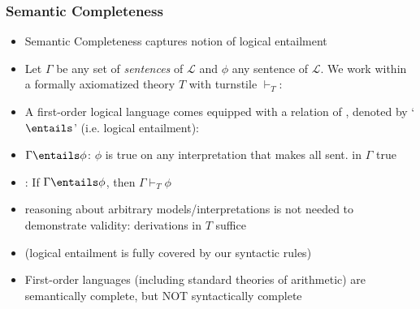 \begin{frame}
\frametitle{Semantic Completeness}

\begin{itemize}[<+->]

\item Semantic Completeness captures notion of logical entailment

\item Let $\Gamma$ be any set of \textit{sentences} of $\mathcal{L}$ and $\phi$ any sentence of $\mathcal{L}$. We work within a formally axiomatized theory $T$ with turnstile $\vdash_T$:

\item A first-order logical language comes equipped with a relation of , denoted by `$\entails$' (i.e. logical entailment):
\item[] $\Gamma \entails \phi$: $\phi$ is true on any interpretation that makes all sent. in $\Gamma$ true %

\item {}: If $\Gamma \entails \phi$, then $\Gamma \vdash_{T} \phi$


\medskip 

\bi

\item reasoning about arbitrary models/interpretations is not needed to demonstrate validity: derivations in $T$ suffice 

\item (logical entailment is fully covered by our syntactic rules)


\ei

\item First-order languages (including standard theories of arithmetic) are semantically complete, but NOT syntactically complete

\end{itemize}
\end{frame}

